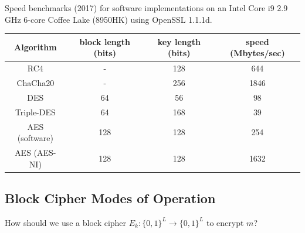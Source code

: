 \documentclass[12pt,titlepage]{article}
\begin{document}
Speed benchmarks (2017) for software implementations on an Intel Core i9 2.9 GHz 6-core Coffee Lake (8950HK) using OpenSSL 1.1.1d.

\begin{center}
	\begin{tabular}{cccc}
		Algorithm      & block length (bits) & key length (bits) & speed (Mbytes/sec) \\
		\hline\hline
		RC4            & -                   & 128               & 644                \\
		ChaCha20       & -                   & 256               & 1846               \\
		DES            & 64                  & 56                & 98                 \\
		Triple-DES     & 64                  & 168               & 39                 \\
		AES (software) & 128                 & 128               & 254                \\
		AES (AES-NI)   & 128                 & 128               & 1632               
	\end{tabular}
\end{center}

\subsection{Block Cipher Modes of Operation}

How should we use a block cipher $E_k : \{0, 1\}^L \rightarrow \{0, 1\}^L$ to encrypt $m$?
\end{document}
